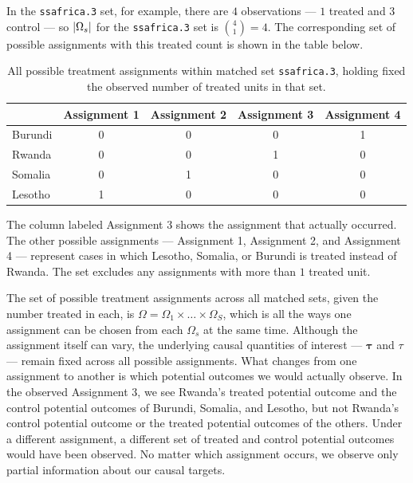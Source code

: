 \documentclass[
  12pt,
  leqno]{article}
\DeclarePairedDelimiter\abs{\lvert}{\rvert}
\begin{document}
In the \texttt{ssafrica.3} set, for example, there are \(4\)
observations --- \(1\) treated and \(3\) control --- so
\(\abs{\Omega_s}\) for the \texttt{ssafrica.3} set is
\(\binom{4}{1} = 4\). The corresponding set of possible assignments with
this treated count is shown in the table below.

\singlespacing
\begin{table}[htbp]
\centering
\begin{tabular}{l|cccc}
\hline
 & Assignment 1 & Assignment 2 & Assignment 3 & Assignment 4
 \\
\hline
Burundi & 0 & 0 & 0 & 1 \\
Rwanda & 0 & 0 & 1 & 0 \\
Somalia & 0 & 1 & 0 & 0 \\
Lesotho & 1 & 0 & 0 & 0 \\
\hline
\end{tabular}
\caption{All possible treatment assignments within matched set \texttt{ssafrica.3}, holding fixed the observed number of treated units in that set.}
\label{tab: ssafrica.3 assignments}
\end{table}
\doublespacing

\FloatBarrier

The column labeled Assignment 3 shows the assignment that actually
occurred. The other possible assignments --- Assignment 1, Assignment 2,
and Assignment 4 --- represent cases in which Lesotho, Somalia, or
Burundi is treated instead of Rwanda. The set excludes any assignments
with more than \(1\) treated unit.

The set of possible treatment assignments across all matched sets, given
the number treated in each, is
\(\Omega = \Omega_1 \times \ldots \times \Omega_S\), which is all the
ways one assignment can be chosen from each \(\Omega_s\) at the same
time. Although the assignment itself can vary, the underlying causal
quantities of interest --- \(\bm{\tau}\) and \(\tau\) --- remain fixed
across all possible assignments. What changes from one assignment to
another is which potential outcomes we would actually observe. In the
observed Assignment 3, we see Rwanda's treated potential outcome and the
control potential outcomes of Burundi, Somalia, and Lesotho, but not
Rwanda's control potential outcome or the treated potential outcomes of
the others. Under a different assignment, a different set of treated and
control potential outcomes would have been observed. No matter which
assignment occurs, we observe only partial information about our causal
targets.
\end{document}
